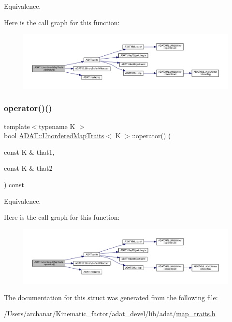 Equivalence. 

Here is the call graph for this function\+:
\nopagebreak
\begin{figure}[H]
\begin{center}
\leavevmode
\includegraphics[width=350pt]{dd/d81/structADAT_1_1UnorderedMapTraits_a14c1daf5e4530fc4c749ec681103e7a2_cgraph}
\end{center}
\end{figure}
\mbox{\label{structADAT_1_1UnorderedMapTraits_a14c1daf5e4530fc4c749ec681103e7a2}} 
\subsubsection{\texorpdfstring{operator()()}{operator()()}\hspace{0.1cm}{\footnotesize\ttfamily [4/4]}}
{\footnotesize\ttfamily template$<$typename K $>$ \\
bool \mbox{\hyperlink{structADAT_1_1UnorderedMapTraits}{A\+D\+A\+T\+::\+Unordered\+Map\+Traits}}$<$ K $>$\+::operator() (\begin{DoxyParamCaption}\item[{const K \&}]{that1,  }\item[{const K \&}]{that2 }\end{DoxyParamCaption}) const\hspace{0.3cm}{\ttfamily [inline]}}



Equivalence. 

Here is the call graph for this function\+:
\nopagebreak
\begin{figure}[H]
\begin{center}
\leavevmode
\includegraphics[width=350pt]{dd/d81/structADAT_1_1UnorderedMapTraits_a14c1daf5e4530fc4c749ec681103e7a2_cgraph}
\end{center}
\end{figure}


The documentation for this struct was generated from the following file\+:\begin{DoxyCompactItemize}
\item 
/\+Users/archanar/\+Kinematic\+\_\+factor/adat\+\_\+devel/lib/adat/\mbox{\hyperlink{lib_2adat_2map__traits_8h}{map\+\_\+traits.\+h}}\end{DoxyCompactItemize}
